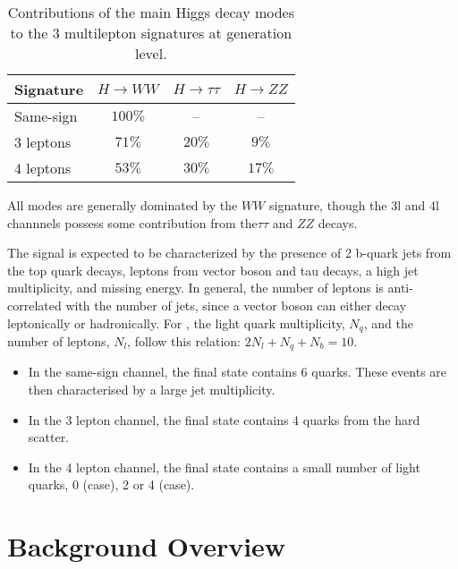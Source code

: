 \begin{table}[htbp]
  \begin{center} 
    \caption{Contributions of the main Higgs decay modes to the 3 multilepton
      \tth signatures at generation level.
      }\label{ana:table_decay} 
      \begin{tabular}{l|c|c|c} 
      \hline\hline
  Signature & $H \rightarrow WW$  & $H\rightarrow \tau\tau$  & $H \rightarrow
  ZZ$  \\\hline
  Same-sign &  $100\%$ & -- & -- \\
  3 leptons  &  $71\%$ & $20\%$ & $9\%$ \\
  4 leptons  &  $53\%$ & $30\%$ & $17\%$  \\
     \hline
    \end{tabular}
  \end{center}
\end{table}


All modes are generally dominated by the $WW$ signature, though the 3l and 4l
channnels possess some contribution from the$\tau\tau$ and $ZZ$ decays. 


The signal is expected to be characterized by the presence of 2 b-quark jets from
the top quark decays, leptons from vector boson and tau decays,
a high jet multiplicity, and missing energy. In general, the number of leptons is anti-correlated 
with the number of jets, since a vector boson can either decay leptonically 
or hadronically. For \hww, the light quark multiplicity, $N_q$, and the
number of leptons, $N_l$, follow this relation: $2N_l+N_q+N_b=10$.

\begin{itemize}
\item In the same-sign channel, the \tth final state contains 6 quarks. These events
are then characterised by a large jet multiplicity.

\item In the 3 lepton channel, the \tth final state contains 4 quarks from the hard scatter.

\item In the 4 lepton channel, the \tth final state contains a small number of light
quarks, 0 (\hww case), 2 or 4 (\hzz case).


\end{itemize} 

\section{Background Overview}

